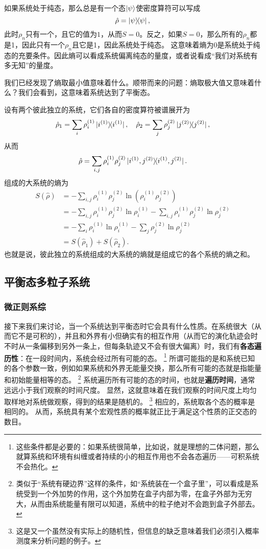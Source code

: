 \documentclass[hyperref, UTF8, a4paper]{ctexart}
\begin{document}
如果系统处于纯态，那么总是有一个态$\ket{\psi}$使密度算符可以写成
\[
    \hat{\rho} = \dyad{\psi},
\]
此时$\rho_n$只有一个，且它的值为$1$，从而$S=0$。反之，如果$S=0$，那么所有的$\rho_n$都是1，因此只有一个$\rho_n$且它是1，因此系统处于纯态。
这意味着熵为$0$是系统处于纯态的充要条件。因此熵可以看成系统偏离纯态的量度，或者说看成“我们对系统有多无知”的量度。

我们已经发现了熵取最小值意味着什么。顺带而来的问题：熵取极大值又意味着什么？我们会看到，这意味着系统达到了平衡态。

设有两个彼此独立的系统，它们各自的密度算符被谱展开为
\[
    \hat{\rho}_1 = \sum_i \rho_i^{(1)} \dyad*{i^{(1)}}, \quad \hat{\rho}_2 = \sum_j \rho_j^{(2)} \dyad*{j^{(2)}},
\]
从而
\[
    \hat{\rho} = \sum_{i,j} \rho_i^{(1)} \rho_j^{(2)} \dyad*{i^{(1)}, j^{(2)}}.
\]
组成的大系统的熵为
\[
    \begin{aligned}
        S(\hat{\rho}) &= - \sum_{i, j} \rho_i^{(1)} \rho_j^{(2)} \ln (\rho_i^{(1)} \rho_j^{(2)}) \\
        &= - \sum_{i, j} \rho_i^{(1)} \rho_j^{(2)} \ln \rho_i^{(1)} - \sum_{i, j} \rho_i^{(1)} \rho_j^{(2)} \ln \rho_j^{(2)} \\
        &= - \sum_i \rho_i^{(1)} \ln \rho_i^{(1)} - \sum_j \rho_j^{(2)} \ln \rho_j^{(2)} \\
        &= S(\hat{\rho}_1) + S(\hat{\rho}_2).
    \end{aligned}
\]
也就是说，彼此独立的系统组成的大系统的熵就是组成它的各个系统的熵之和。

\subsection{平衡态多粒子系统}

\subsubsection{微正则系综}

接下来我们来讨论，当一个系统达到平衡态时它会具有什么性质。在系统很大（从而它不是可积的），并且和外界有小但确实有的相互作用（从而它的演化轨迹会时不时从一条偏移到另外一条上，但每条轨迹又不会有很大偏离）时，我们有\textbf{各态遍历性}：在一段时间内，系统会经过所有可能的态。%
\footnote{这些条件都是必要的：如果系统很简单，比如说，就是理想的二体问题，那么就算系统和环境有纠缠或者持续的小的相互作用也不会各态遍历——可积系统不会热化。}%
所谓可能指的是和系统已知的各个参数一致，例如如果系统和外界无能量交换，那么所有可能的态就是指能量和初始能量相等的态。%
\footnote{类似于“系统有硬边界”这样的条件，如“系统装在一个盒子里”，可以看成是系统受到一个外加势的作用，这个外加势在盒子内部为零，在盒子外部为无穷大，从而由系统能量有限可以知道，系统中的粒子绝对不会跑到盒子外部去。}
系统遍历所有可能的态的时间，也就是\textbf{遍历时间}，通常远远小于我们观察的时间尺度。
显然，这就意味着在我们观察的时间尺度上均匀取样地对系统做观察，得到的结果是随机的。%
\footnote{这是又一个虽然没有实际上的随机性，但信息的缺乏意味着我们必须引入概率测度来分析问题的例子。}%
相应的，系统取各个态的概率是相同的。
从而，系统具有某个宏观性质的概率就正比于满足这个性质的正交态的数目。
\end{document}
